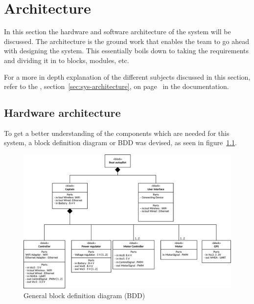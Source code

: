 
\chapter{Architecture}

In this section the hardware and software architecture of the system will be discussed. The architecture is the ground work that enables the team to go ahead with designing the system. This essentially boils down to taking the requirements and dividing it in to blocks, modules, etc.

For a more in depth explanation of the different subjects discussed in this section, refer to the , section~\ref{sec:sys-architecture}, on page~\pageref{sec:sys-architecture} in the documentation.

\section{Hardware architecture}
To get a better understanding of the components which are needed for this system, a block definition diagram or BDD was devised, as seen in figure~\ref{fig:generalbdd}. 

\begin{figure}[H]
\centering
\includegraphics[width=1\linewidth]{../Appendix/Project/Dokumentation/Images/System_architecture/General_BDD}
\caption{General block definition diagram (BDD)}
\label{fig:generalbdd}
\end{figure}

